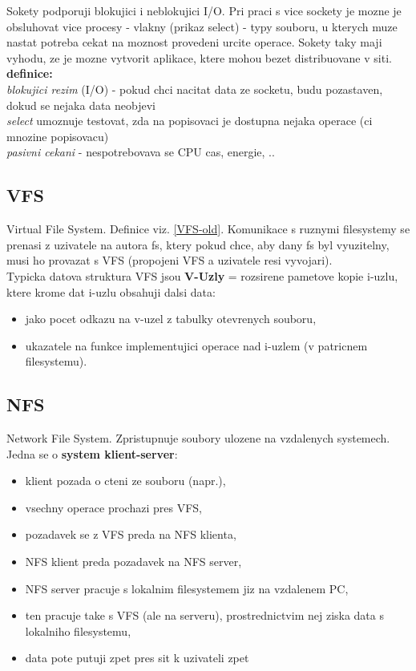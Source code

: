 \documentclass[a4paper, 11pt]{article}
\begin{document}
Sokety podporuji blokujici i neblokujici I/O. Pri praci s vice sockety je mozne je obsluhovat vice procesy - vlakny (prikaz select) - typy souboru, u kterych muze nastat potreba cekat na moznost provedeni urcite operace. Sokety taky maji vyhodu, ze je mozne vytvorit aplikace, ktere mohou bezet distribuovane v siti. \\

\textbf{definice:} \\[0.5em]
\textit{blokujici rezim} (I/O) - pokud chci nacitat data ze socketu, budu pozastaven, dokud se nejaka data neobjevi \\[0.2em]
\textit{select} umoznuje testovat, zda na popisovaci je dostupna nejaka operace (ci mnozine popisovacu) \\[0.2em]
\textit{pasivni cekani} - nespotrebovava se CPU cas, energie, .. \\

\subsection{VFS} \label{VFS-new}
Virtual File System. Definice viz. \ref{VFS-old}. Komunikace s ruznymi filesystemy se prenasi z uzivatele na autora fs, ktery pokud chce, aby dany fs byl vyuzitelny, musi ho provazat s VFS (propojeni VFS a uzivatele resi vyvojari). \\

Typicka datova struktura VFS jsou \textbf{V-Uzly} = rozsirene pametove kopie i-uzlu, ktere krome dat i-uzlu obsahuji dalsi data:
\begin{itemize}
    \item jako pocet odkazu na v-uzel z tabulky otevrenych souboru, 
    \item ukazatele na funkce implementujici operace nad i-uzlem (v patricnem filesystemu). \\
\end{itemize}

\newpage

\subsection{NFS} \label{NFS-more}
Network File System. Zpristupnuje soubory ulozene na vzdalenych systemech. \\

Jedna se o \textbf{system klient-server}:
\begin{itemize}
    \item klient pozada o cteni ze souboru (napr.),
    \item vsechny operace prochazi pres VFS,
    \item pozadavek se z VFS preda na NFS klienta,
    \item NFS klient preda pozadavek na NFS server,
    \item NFS server pracuje s lokalnim filesystemem jiz na vzdalenem PC,
    \item ten pracuje take s VFS (ale na serveru), prostrednictvim nej ziska data s lokalniho filesystemu,
    \item data pote putuji zpet pres sit k uzivateli zpet \\
\end{itemize}
\end{document}
